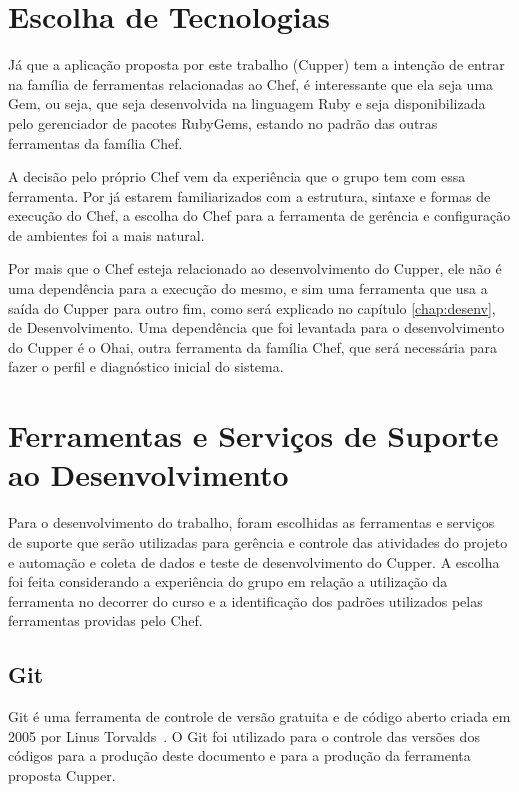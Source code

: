 \section{Escolha de Tecnologias}
\label{sec:tec}


Já que a aplicação proposta por este trabalho (Cupper) tem a intenção de entrar
na família de ferramentas relacionadas ao Chef, é interessante que ela seja uma
Gem, ou seja, que seja desenvolvida na linguagem Ruby e seja disponibilizada pelo %
gerenciador de pacotes RubyGems, estando no padrão das outras ferramentas da
família Chef.

A decisão pelo próprio Chef vem da experiência que o grupo tem com essa ferramenta.
Por já estarem familiarizados com a estrutura, sintaxe e formas de execução do Chef,
a escolha do Chef para a ferramenta de gerência e configuração de ambientes foi a
mais natural. %

Por mais que o Chef esteja relacionado ao desenvolvimento do Cupper, ele não é uma
dependência para a execução do mesmo, e sim uma ferramenta que usa a saída do Cupper
para outro fim, como será explicado no capítulo \ref{chap:desenv}, de Desenvolvimento.
Uma dependência que foi levantada para o desenvolvimento do Cupper é o Ohai,
outra ferramenta da família Chef, que será necessária para fazer o perfil e diagnóstico
inicial do sistema. %

\section{Ferramentas e Serviços de Suporte ao Desenvolvimento}

Para o desenvolvimento do trabalho, foram escolhidas as ferramentas e serviços de suporte que serão
utilizadas para gerência e controle das atividades do projeto e automação e coleta de dados e teste
de desenvolvimento do Cupper. A escolha foi feita considerando a experiência do
grupo em relação a utilização da ferramenta no decorrer do curso e a identificação dos
padrões utilizados pelas ferramentas providas pelo Chef.

\subsection{Git}

Git é uma ferramenta de controle de versão gratuita e de código aberto criada
em 2005 por Linus Torvalds~\cite{chacon:2014}. O Git foi utilizado para o controle das versões
dos códigos para a produção deste documento e para a produção da ferramenta proposta Cupper.

